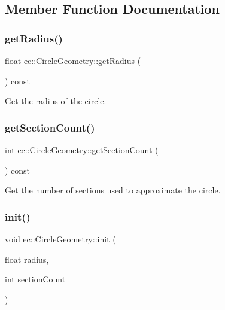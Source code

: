 \subsection{Member Function Documentation}
\mbox{\label{classec_1_1_circle_geometry_a7926a1f020f9b4998e0d4be0912b7b80}} 
\subsubsection{\texorpdfstring{get\+Radius()}{getRadius()}}
{\footnotesize\ttfamily float ec\+::\+Circle\+Geometry\+::get\+Radius (\begin{DoxyParamCaption}{ }\end{DoxyParamCaption}) const}



Get the radius of the circle. 

\mbox{\label{classec_1_1_circle_geometry_a68648b12d6d2d7ffaf39d141f758e22b}} 
\subsubsection{\texorpdfstring{get\+Section\+Count()}{getSectionCount()}}
{\footnotesize\ttfamily int ec\+::\+Circle\+Geometry\+::get\+Section\+Count (\begin{DoxyParamCaption}{ }\end{DoxyParamCaption}) const}



Get the number of sections used to approximate the circle. 

\mbox{\label{classec_1_1_circle_geometry_aef6ab090302b5370c4369ec3f806f98e}} 
\subsubsection{\texorpdfstring{init()}{init()}}
{\footnotesize\ttfamily void ec\+::\+Circle\+Geometry\+::init (\begin{DoxyParamCaption}\item[{float}]{radius,  }\item[{int}]{section\+Count }\end{DoxyParamCaption})}



